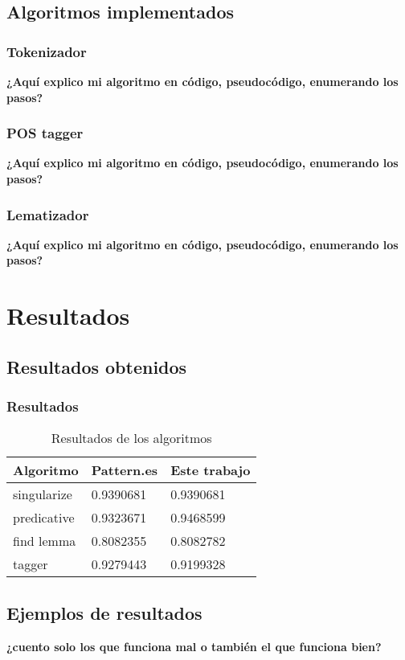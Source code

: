 \documentclass{beamer}
\begin{document}
\subsection{Algoritmos implementados}
\begin{frame}
\frametitle{Tokenizador}
\textbf{¿Aquí explico mi algoritmo en código, pseudocódigo, enumerando los pasos?}
\end{frame}
\begin{frame}
\frametitle{POS tagger}
\textbf{¿Aquí explico mi algoritmo en código, pseudocódigo, enumerando los pasos?}
\end{frame}
\begin{frame}
\frametitle{Lematizador}
\textbf{¿Aquí explico mi algoritmo en código, pseudocódigo, enumerando los pasos?}
\end{frame}

\section{Resultados}
\subsection{Resultados obtenidos}
\begin{frame}
\frametitle{Resultados}
\begin{table}
\begin{tabular}{l l l}
\toprule
\textbf{Algoritmo} & \textbf{Pattern.es} & \textbf{Este trabajo}\\
\midrule
singularize & 0.9390681  & 0.9390681 \\
predicative & 0.9323671  & 0.9468599 \\
find lemma  & 0.8082355  & 0.8082782 \\
tagger      & 0.9279443  & 0.9199328 \\
\bottomrule
\end{tabular}
\caption{Resultados de los algoritmos}
\end{table}
\end{frame}


\subsection{Ejemplos de resultados}
\begin{frame}
\textbf{¿cuento solo los que funciona mal o también el que funciona bien?}
\end{frame}
\end{document}

